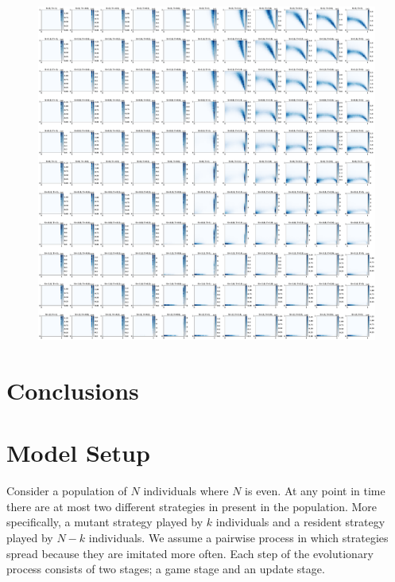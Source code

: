 \documentclass[11pt]{article}
\theoremstyle{plainCl1}
\theoremstyle{plainCl2}
\begin{document}
\begin{figure}
  \centering
  \includegraphics[width=\textwidth]{static/expected_two_by_two_games.pdf}
\end{figure}


\section{Conclusions}\label{section:conclusions}

\appendix

\section{Model Setup}\label{appendix:methods}

Consider a population of \(N\) individuals where \(N\) is even. At any point in
time there are at most two different strategies in present in the population.
More specifically, a mutant strategy played by \(k\) individuals and a resident
strategy played by \(N - k\) individuals. We assume a pairwise process in which
strategies spread because they are imitated more often. Each step of the
evolutionary process consists of two stages; a game stage and an update stage.
\end{document}
